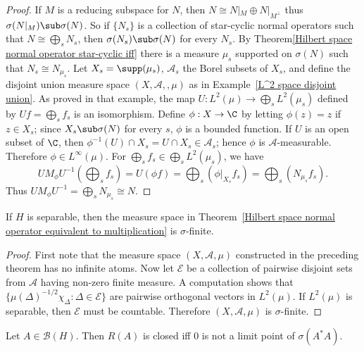 \begin{proof}
If $M$ is a reducing subspace for $N$, then $N\cong N|_M\oplus N|_{M^\bot}$ thus $\sigma(N|_M)\sub\sigma(N)$. So if $\{N_s\}$ is a collection of star-cyclic normal operators such that $N\cong\bigoplus_sN_s$, then $\sigma(N_s)\sub\sigma(N)$ for every $N_s$. By Theorem\ref{Hilbert space normal operator star-cyclic iff} there is a measure $\mu_s$ supported on $\sigma(N)$ such that $N_s\cong N_{\mu_s}$. Let $X_s=\supp(\mu_s)$, $\mathcal{A}_s$ the Borel subsets of $X_s$, and define the disjoint union measure space $(X,\mathcal{A},,\mu)$ as in Example~\ref{L^2 space disjoint union}. As proved in that example, the map $U:L^2(\mu)\to\bigoplus_sL^2(\mu_s)$ defined by $Uf=\bigoplus_sf_s$ is an isomorphism. Define $\phi:X\to\C$ by letting $\phi(z)=z$ if $z\in X_s$; since $X_s\sub\sigma(N)$ for every $s$, $\phi$ is a bounded function. If $U$ is an open subset of $\C$, then $\phi^{-1}(U)\cap X_s=U\cap X_s\in\mathcal{A}_s$; hence $\phi$ is $\mathcal{A}$-measurable. Therefore $\phi\in L^\infty(\mu)$. For $\bigoplus_sf_s\in\bigoplus_sL^2(\mu_s)$, we have
\[UM_\phi U^{-1}(\bigoplus_sf_s)=U(\phi f)=\bigoplus_s(\phi|_{X_s}f_s)=\bigoplus_s(N_{\mu_s}f_s).\]
Thus $UM_\phi U^{-1}=\bigoplus_sN_{\mu_s}\cong N$.
\end{proof}
\begin{proposition}
If $H$ is separable, then the measure space in Theorem~\ref{Hilbert space normal operator equivalent to multiplication} is $\sigma$-finite.
\end{proposition}
\begin{proof}
First note that the measure space $(X,\mathcal{A},\mu)$ constructed in the preceding theorem has no infinite atoms. Now let $\mathcal{E}$ be a collection of pairwise disjoint sets from $\mathcal{A}$ having non-zero finite measure. A computation shows that $\{\mu(\Delta)^{-1/2}\chi_\Delta:\Delta\in\mathscr{E}\}$ are pairwise orthogonal vectors in $L^2(\mu)$. If $L^2(\mu)$ is separable, then $\mathscr{E}$ must be countable. Therefore $(X,\mathcal{A},\mu)$ is $\sigma$-finite.
\end{proof}
\begin{theorem}\label{Hilbert space closed range iff spectrum}
Let $A\in\mathcal{B}(H)$. Then $R(A)$ is closed iff $0$ is not a limit point of $\sigma(A^*A)$.
\end{theorem}
